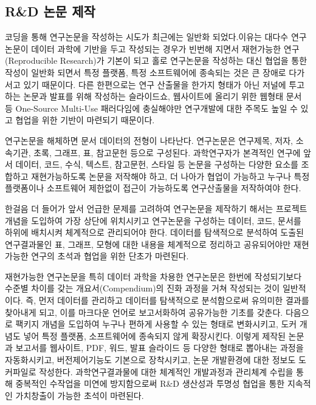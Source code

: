 \documentclass[smallextended]{svjour3}       %
\begin{document}
\hypertarget{rd-uxb17cuxbb38-uxc81cuxc791}{%
\subsection{R\&D 논문 제작}\label{rd-uxb17cuxbb38-uxc81cuxc791}}

코딩을 통해 연구논문을 작성하는 시도가 최근에는 일반화 되었다.이유는
대다수 연구논문이 데이터 과학에 기반을 두고 작성되는 경우가 빈번해
지면서 재현가능한 연구(Reproducible Research)가 기본이 되고 홀로
연구논문을 작성하는 대신 협업을 통한 작성이 일반화 되면서 특정 플랫폼,
특정 소프트웨어에 종속되는 것은 큰 장애로 다가서고 있기 때문이다. 다른
한편으로는 연구 산출물을 한가지 형태가 아닌 저널에 투고하는 논문과
발표를 위해 작성하는 슬라이드쇼, 웹사이트에 올리기 위한 웹형태 문서 등
One-Source Multi-Use 패러다임에 충실해야만 연구개발에 대한 주목도 높일
수 있고 협업을 위한 기반이 마련되기 때문이다.

연구논문을 해체하면 문서 데이터의 전형이 나타난다. 연구논문은 연구제목,
저자, 소속기관, 초록, 그래프, 표, 참고문헌 등으로 구성된다. 과학연구자가
본격적인 연구에 앞서 데이터, 코드, 수식, 텍스트, 참고문헌, 스타일 등
논문을 구성하는 다양한 요소를 조합하고 재현가능하도록 논문을 저작해야
하고, 더 나아가 협업이 가능하고 누구나 특정 플랫폼이나 소프트웨어
제한없이 접근이 가능하도록 연구산출물을 저작하여야 한다.

한걸음 더 들어가 앞서 언급한 문제를 고려하여 연구논문을 제작하기 해서는
프로젝트 개념을 도입하여 가장 상단에 위치시키고 연구논문을 구성하는
데이터, 코드, 문서를 하위에 배치시켜 체계적으로 관리되어야 한다.
데이터를 탐색적으로 분석하여 도출된 연구결과물인 표, 그래프, 모형에 대한
내용을 체계적으로 정리하고 공유되어야만 재현가능한 연구의 초석과 협업을
위한 단초가 마련된다.

재현가능한 연구논문을 특히 데이터 과학을 차용한 연구논문은 한번에
작성되기보다 수준별 차이를 갖는 개요서(Compendium)의 진화 과정을 거쳐
작성되는 것이 일반적이다. 즉, 먼저 데이터를 관리하고 데이터를 탐색적으로
분석함으로써 유의미한 결과를 찾아내게 되고, 이를 마크다운 언어로
보고서화하여 공유가능한 기초를 갖춘다. 다음으로 팩키지 개념을 도입하여
누구나 편하게 사용할 수 있는 형태로 변화시키고, 도커 개념도 넣어 특정
플랫폼, 소프트웨어에 종속되지 않게 확장시킨다. 이렇게 제작된 논문과
보고서를 웹사이트, PDF, 워드, 발표 슬라이드 등 다양한 형태로 뽑아내는
과정을 자동화시키고, 버전제어기능도 기본으로 장착시키고, 논문 개발환경에
대한 정보도 도커파일로 작성한다. 과학연구결과물에 대한 체계적인
개발과정과 관리체계 수립을 통해 중복적인 수작업을 미연에 방지함으로써
R\&D 생산성과 투명성 협업을 통한 지속적인 가치창출이 가능한 초석이
마련된다.
\end{document}

